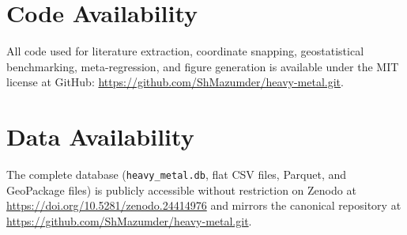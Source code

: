 \documentclass[11pt,a4paper]{article}
\begin{document}
\section*{Code Availability}
All code used for literature extraction, coordinate snapping, geostatistical benchmarking, meta-regression, and figure generation is available under the MIT license at GitHub: \url{https://github.com/ShMazumder/heavy-metal.git}.

\section*{Data Availability}
The complete database (\texttt{heavy\_metal.db}, flat CSV files, Parquet, and GeoPackage files) is publicly accessible without restriction on Zenodo at \url{https://doi.org/10.5281/zenodo.24414976} and mirrors the canonical repository at \url{https://github.com/ShMazumder/heavy-metal.git}.



\end{document}
